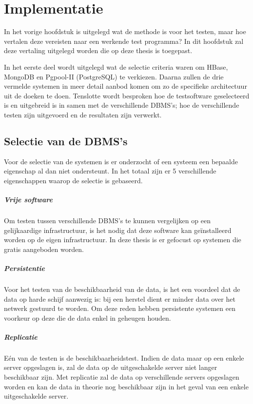 \chapter{Implementatie}\label{sec:implementatie}
In het vorige hoofdstuk is uitgelegd wat de methode is voor het testen, maar hoe vertalen deze vereisten naar een werkende test programma? In dit hoofdstuk zal deze vertaling uitgelegd worden die op deze thesis is toegepast. 

In het eerste deel wordt uitgelegd wat de selectie criteria waren om HBase, MongoDB en Pgpool-II (PostgreSQL) te verkiezen. Daarna zullen de drie vermelde systemen in meer detail aanbod komen om zo de specifieke architectuur uit de doeken te doen. Tenslotte wordt besproken hoe de testsoftware geselecteerd is en uitgebreid is in samen met de verschillende DBMS's; hoe de verschillende testen zijn uitgevoerd en de resultaten zijn verwerkt. 
 
\section{Selectie van de DBMS's}
Voor de selectie van de systemen is er onderzocht of een systeem een bepaalde eigenschap al dan niet ondersteunt. In het totaal zijn er 5 verschillende eigenschappen waarop de selectie is gebaseerd. 

\paragraph{Vrije software} Om testen tussen verschillende DBMS's te kunnen vergelijken op een gelijkaardige infrastructuur, is het nodig dat deze software kan geïnstalleerd worden op de eigen infrastructuur. In deze thesis is er gefocust op systemen die gratis aangeboden worden. 

\paragraph{Persistentie} Voor het testen van de beschikbaarheid van de data, is het een voordeel dat de data op harde schijf aanwezig is: bij een herstel dient er minder data over het netwerk gestuurd te worden. Om deze reden hebben persistente systemen een voorkeur op deze die de data enkel in geheugen houden. 

\paragraph{Replicatie} Eén van de testen is de beschikbaarheidstest. Indien de data maar op een enkele server opgeslagen is, zal de data op de uitgeschakelde server niet langer beschikbaar zijn. Met replicatie zal de data op verschillende servers opgeslagen worden en kan de data in theorie nog beschikbaar zijn in het geval van een enkele uitgeschakelde server. 

